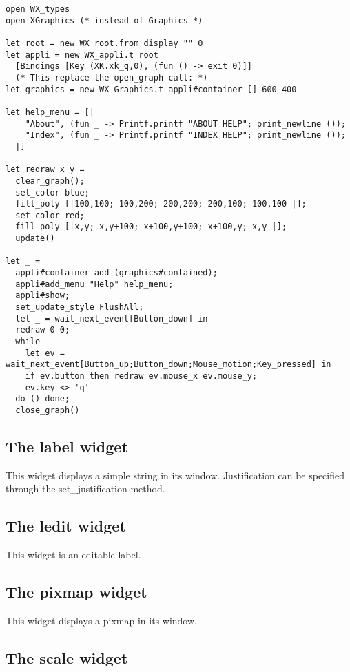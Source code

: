 \documentclass{report}
\begin{document}
\begin{verbatim}
open WX_types
open XGraphics (* instead of Graphics *)

let root = new WX_root.from_display "" 0
let appli = new WX_appli.t root 
  [Bindings [Key (XK.xk_q,0), (fun () -> exit 0)]]
  (* This replace the open_graph call: *)
let graphics = new WX_Graphics.t appli#container [] 600 400

let help_menu = [|
    "About", (fun _ -> Printf.printf "ABOUT HELP"; print_newline ());
    "Index", (fun _ -> Printf.printf "INDEX HELP"; print_newline ());
  |]
  
let redraw x y =
  clear_graph();
  set_color blue;
  fill_poly [|100,100; 100,200; 200,200; 200,100; 100,100 |];
  set_color red;
  fill_poly [|x,y; x,y+100; x+100,y+100; x+100,y; x,y |];
  update()

let _ =
  appli#container_add (graphics#contained);  
  appli#add_menu "Help" help_menu;
  appli#show;
  set_update_style FlushAll;
  let _ = wait_next_event[Button_down] in
  redraw 0 0;
  while 
    let ev = wait_next_event[Button_up;Button_down;Mouse_motion;Key_pressed] in
    if ev.button then redraw ev.mouse_x ev.mouse_y;
    ev.key <> 'q'
  do () done;
  close_graph()
\end{verbatim}

\subsection{The {\sf label} widget}

This widget displays a simple string in its window. Justification can be 
specified through the {\sf set\_justification} method.

\subsection{The {\sf ledit} widget}

This widget is an editable label.

\subsection{The {\sf pixmap} widget}

This widget displays a pixmap in its window.

\subsection{The {\sf scale} widget}
\end{document}

